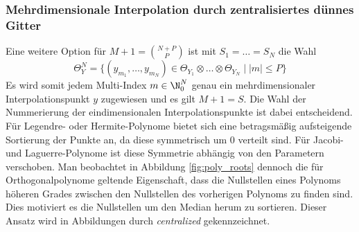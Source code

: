 \subsubsection*{Mehrdimensionale Interpolation durch zentralisiertes dünnes Gitter}
Eine weitere Option für $M+1=\binom{N+P}{P}$ ist mit $S_1=\dots=S_N$ die Wahl
\[\Theta_Y^N=\lbrace (y_{m_1},\dots,y_{m_N})\in \Theta_{Y_1}\otimes \dots \otimes \Theta_{Y_N} \mid |m|\le P \rbrace \]
Es wird somit jedem Multi-Index $m\in\N_0^N$ genau ein mehrdimensionaler Interpolationspunkt $y$ zugewiesen und es gilt $M+1=S$. Die Wahl der Nummerierung der eindimensionalen Interpolationspunkte ist dabei entscheidend. Für Legendre- oder Hermite-Polynome bietet sich eine betragsmäßig aufsteigende Sortierung der Punkte an, da diese symmetrisch um $0$ verteilt sind. Für Jacobi- und Laguerre-Polynome ist diese Symmetrie abhängig von den Parametern verschoben. Man beobachtet in Abbildung \ref{fig:poly_roots} dennoch die für Orthogonalpolynome geltende Eigenschaft, dass die Nullstellen eines Polynoms höheren Grades zwischen den Nullstellen des vorherigen Polynoms zu finden sind. Dies motiviert es die Nullstellen um den Median herum zu sortieren. Dieser Ansatz wird in Abbildungen durch \textit{centralized} gekennzeichnet.
